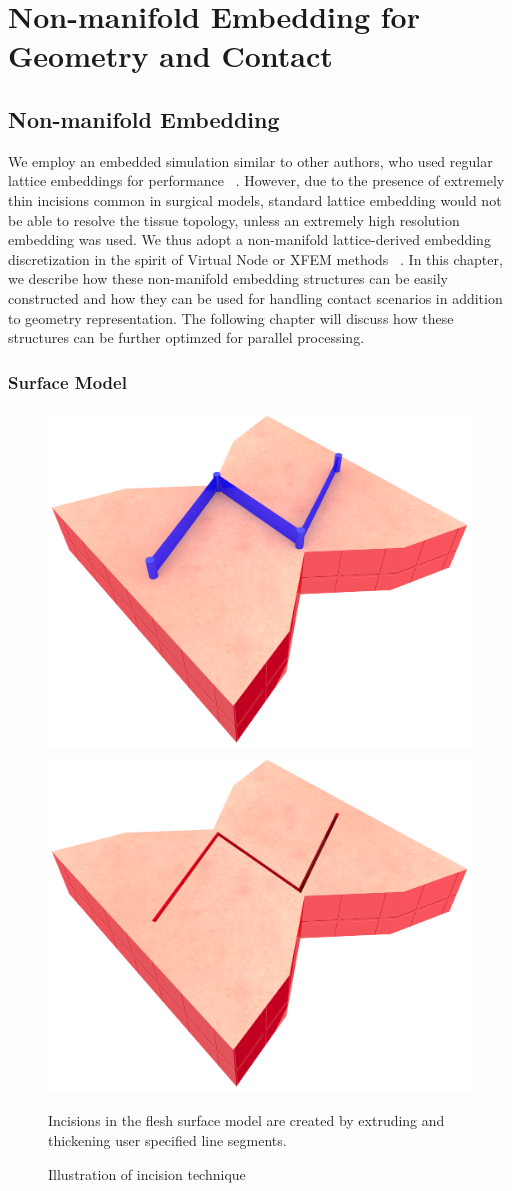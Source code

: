 \chapter{Non-manifold Embedding for Geometry and Contact}
\label{chp:nonmanifold}

\section{Non-manifold Embedding}
\label{sec:hybrid}

We employ an embedded simulation similar to other authors, who used
regular lattice embeddings for performance
~\citep{MuellTG:2004,RiverJ:2007,McAdaZSETTS:2011}. However, due to the
presence of extremely thin incisions common in surgical models, standard
lattice embedding would not be able to resolve the tissue topology,
unless an extremely high resolution embedding was used. We thus adopt
a non-manifold lattice-derived embedding discretization in the spirit
of Virtual Node or XFEM methods
~\citep{MolinBF:2004,SifakDF:2007,NesmeKJF:2009}.  In this chapter, we
describe how these non-manifold embedding structures can be easily
constructed and how they can be used for handling contact scenarios in
addition to geometry representation. The following chapter will
discuss how these structures can be further optimzed for parallel
processing.

\subsection{Surface Model}

\begin{figure}
  \centering
  \includegraphics[width=.45\columnwidth]{chapter_gridiron/images/Uncut_Surface_Model2.png}
  \includegraphics[width=.45\columnwidth]{chapter_gridiron/images/Cut_Surface_Model2.png}
  \caption{Illustration of incision technique}{Incisions in the flesh surface model are created by extruding and thickening user specified line segments.}
\label{fig:incision}
\end{figure}

